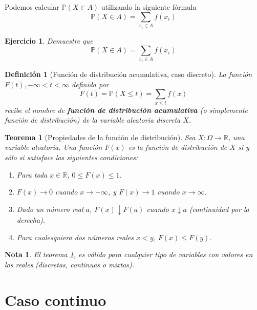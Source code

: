 \documentclass[11pt]{report}
\theoremstyle{break}
\newtheorem{definicion}{Definición}[chapter]
\newtheorem{teorema}{Teorema}[chapter]
\newtheorem{nota}{Nota}[chapter]
\newtheorem{ejercicio}{Ejercicio}[chapter]
\theoremstyle{break}
\begin{document}
Podemos calcular $\mathbb{P}(X \in A)$ utilizando la siguiente fórmula
$$
\mathbb{P}(X \in A) = \sum_{x_i \in A}f(x_i)
$$

\begin{ejercicio}
Demuestre que 
$$
\mathbb{P}(X \in A) = \sum_{x_i \in A}f(x_i)
$$
\end{ejercicio}

\begin{definicion}[Función de distribución acumulativa, caso discreto]
\label{definicion:funcion de distribucion caso discreto}
La función $F(t), -\infty < t < \infty$ definida por
$$
F(t) = \mathbb{P}(X \leq t) = \sum_{x \leq t} f(x)
$$
recibe el nombre de \textbf{función de distribución acumulativa} (o simplemente función de distribución) de la variable aleatoria discreta $X$.
\end{definicion}

\begin{teorema}[Propiedades de la función de distribución]
\label{teorema: propiedades de la funcion de distribucion}
Sea $X:\Omega \rightarrow \mathbb{R}$, una variable aleatoria. Una función $F(x)$ es la función de distribución de $X$ si y sólo si satisface las siguientes condiciones:
\begin{enumerate}[label=\alph*)]
\item Para toda $x \in \mathbb{R}$, $0 \leq F(x) \leq 1$.
\item $F(x) \rightarrow 0$ cuando $x \rightarrow -\infty$, y  $F(x) \rightarrow 1$ cuando $x \rightarrow \infty$.
\item Dado un número real $a$, $F(x) \downarrow F(a)$ cuando $x \downarrow a$ (continuidad por la derecha).
\item Para cualesquiera dos números reales $x < y$, $F(x) \leq F(y)$.
\end{enumerate}
\end{teorema}
\begin{nota}
El teorema \ref{teorema: propiedades de la funcion de distribucion}, es válido para cualquier tipo de variables con valores en los reales (discretas, continuas o mixtas).
\end{nota}
\section{Caso continuo}
\label{seccion:variables continuas}
\end{document}
